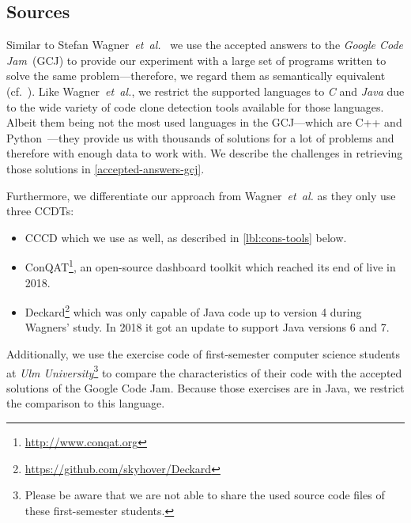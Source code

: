 \documentclass[10pt,journal,compsoc]{IEEEtran}
\def\todo#1{\textcolor{brown!80!yellow!70!black!90!red}{[\textsc{todo}: \textsf{#1}]}}
\newcommand*\urldate[2]{\url{#1}\;\textsuperscript{\color{gray}\DTMdate{#2}}}
\newcommand*\footurl[3][]{\footnote{#1\urldate{#2}{#3}}}
\begin{document}

\subsection{Sources}\label{sec:sources}
Similar to Stefan Wagner~\textsl{et~al.}~\cite{wagner2014detection,wagner2016functionally} we use the accepted answers to the \textit{Google Code Jam}~(GCJ) to provide our experiment with a large set of programs written to solve the same problem---therefore, we regard them as semantically equivalent (cf.~\cite[p.~10]{ComparingProgrammingLanguages2017}).
Like Wagner~\textsl{et~al.}, we restrict the supported languages to \textsl{C} and \textsl{Java} due to the wide variety of code clone detection tools available for those languages. Albeit them being not the most used languages in the GCJ---which are C++ and Python~\cite[Table~5.1]{ComparingProgrammingLanguages2017}---they provide us with thousands of solutions for a lot of problems and therefore with enough data to work with.
We describe the challenges in retrieving those solutions in \cref{accepted-answers-gcj}.


Furthermore, we differentiate our approach from Wagner~\textsl{et~al.} as they only use three CCDTs:
\begin{itemize}
  \item CCCD which we use as well, as described in \cref{lbl:cons-tools} below.
  \item ConQAT\footurl{http://www.conqat.org}{2022-02-15}, an open-source dashboard toolkit which reached its end of live in 2018.
  \item Deckard\footurl{https://github.com/skyhover/Deckard}{2022-02-15} which was only capable of Java code up to version 4 during Wagners' study. In 2018 it got an update to support Java versions 6 and 7.
\end{itemize}
Additionally, we use the exercise code of first-semester computer science students at \textit{Ulm University}\footnote{Please be aware that we are not able to share the used source code files of these first-semester students.} to compare the characteristics of their code with the accepted solutions of the Google Code Jam.
Because those exercises are in Java, we restrict the comparison to this language.
\end{document}
